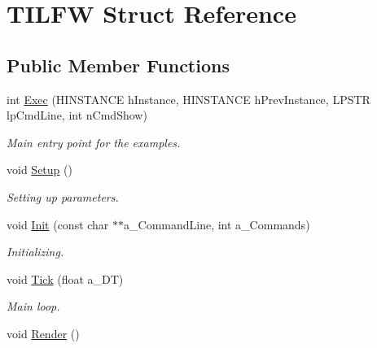 \hypertarget{struct_t_i_l_f_w}{
\section{TILFW Struct Reference}
\label{struct_t_i_l_f_w}
}
\subsection*{Public Member Functions}
\begin{DoxyCompactItemize}
\item 
\hypertarget{struct_t_i_l_f_w_aecb48bbdb0619b3835bc4544b061874d}{
int \hyperlink{struct_t_i_l_f_w_aecb48bbdb0619b3835bc4544b061874d}{Exec} (HINSTANCE hInstance, HINSTANCE hPrevInstance, LPSTR lpCmdLine, int nCmdShow)}
\label{struct_t_i_l_f_w_aecb48bbdb0619b3835bc4544b061874d}

\begin{DoxyCompactList}\small\item\em Main entry point for the examples. \item\end{DoxyCompactList}\item 
\hypertarget{struct_t_i_l_f_w_aebaaa2163cdf8403385a07f812145a77}{
void \hyperlink{struct_t_i_l_f_w_aebaaa2163cdf8403385a07f812145a77}{Setup} ()}
\label{struct_t_i_l_f_w_aebaaa2163cdf8403385a07f812145a77}

\begin{DoxyCompactList}\small\item\em Setting up parameters. \item\end{DoxyCompactList}\item 
\hypertarget{struct_t_i_l_f_w_ab0e057fc141efe5cc81b16d2fb3a4529}{
void \hyperlink{struct_t_i_l_f_w_ab0e057fc141efe5cc81b16d2fb3a4529}{Init} (const char $\ast$$\ast$a\_\-CommandLine, int a\_\-Commands)}
\label{struct_t_i_l_f_w_ab0e057fc141efe5cc81b16d2fb3a4529}

\begin{DoxyCompactList}\small\item\em Initializing. \item\end{DoxyCompactList}\item 
\hypertarget{struct_t_i_l_f_w_ad70e5f24fdc5c8e0dae01cb07278488e}{
void \hyperlink{struct_t_i_l_f_w_ad70e5f24fdc5c8e0dae01cb07278488e}{Tick} (float a\_\-DT)}
\label{struct_t_i_l_f_w_ad70e5f24fdc5c8e0dae01cb07278488e}

\begin{DoxyCompactList}\small\item\em Main loop. \item\end{DoxyCompactList}\item 
\hypertarget{struct_t_i_l_f_w_a2978669783e75e4e9c555c8e6b2d13b7}{
void \hyperlink{struct_t_i_l_f_w_a2978669783e75e4e9c555c8e6b2d13b7}{Render} ()}
\label{struct_t_i_l_f_w_a2978669783e75e4e9c555c8e6b2d13b7}


\end{DoxyCompactItemize}
